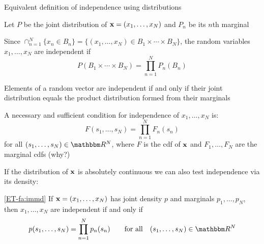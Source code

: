 \begin{frame}

    \vspace{2em}
    Equivalent definition of independence using distributions
    
    Let $P$ be the joint distribution of ${\mathbf x} = (x_1, \ldots, x_N)$ and $P_n$ be its $n$th marginal
    
    Since
    $\cap_{n=1}^N \{x_n \in B_n\}
    = \{ (x_1, \ldots, x_N) \in B_1 \times \cdots \times B_N \}$, the random
    variables $x_1, \ldots, x_N$ are independent if
    \begin{equation*}
        P(B_1 \times \cdots \times B_N) 
        = \prod_{n=1}^N P_n(B_n)
    \end{equation*}
    
    Elements of a random vector are
    independent if and only if their joint distribution equals 
    the product distribution formed from their marginals 
    
\end{frame}

\begin{frame}

    \vspace{2em}
    A necessary and sufficient condition for independence of $x_1,
    \ldots, x_N$ is:
    \begin{equation*}
        \label{eq:pdind}
        F(s_1,\ldots,s_N) 
        = \prod_{n=1}^N F_n(s_n)
    \end{equation*}
    for all $(s_1, \ldots, s_N) \in \RR^N$, where $F$ is the {\sc cdf} of ${\mathbf x}$ and
    $F_1, \ldots, F_N$ are the marginal {\sc cdf}s (why?)
    
\end{frame}

\begin{frame}
    
    \vspace{2em}
    If the distribution of ${\mathbf x}$ is absolutely continuous we can also test
    independence via its density: 
    
    \vspace{1em}
    \Fact\eqref{ET-fa:immd}
        If ${\mathbf x} = (x_1, \ldots, x_N)$ has joint density $p$ and marginals
        $p_1, \ldots, p_N$, then $x_1, \ldots, x_N$ are independent if and only if
        \begin{equation*}
            p (s_1,\ldots, s_N) = \prod_{n=1}^N p_n(s_n)
            \qquad \text{for all} \quad
            (s_1, \ldots, s_N) \in \RR^N
        \end{equation*}
        
\end{frame}

